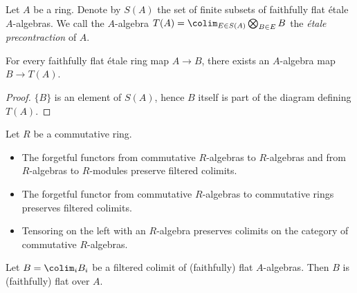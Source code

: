 \begin{definition}
    Let $A$ be a ring. Denote by $S(A)$ the set of finite subsets of faithfully flat étale $A$-algebras.
    We call the $A$-algebra $T(A) = \colim_{E \in S(A)} \bigotimes_{B \in E} B$ the \emph{étale precontraction} of
    $A$.
    \label{def:etale-precontraction}
    \leanok
\end{definition}

\begin{lemma}
    \label{lemma:etale-precontraction-semi-retraction}
    For every faithfully flat étale ring map $A \to B$, there exists an $A$-algebra map $B \to T(A)$.
    \leanok
\end{lemma}

\begin{proof}
    $\{B\}$ is an element of $S(A)$, hence $B$ itself is part of the diagram defining $T(A)$.
    \leanok
\end{proof}

\begin{lemma}
    Let $R$ be a commutative ring.
    \begin{itemize}
        \item The forgetful functors from commutative $R$-algebras to $R$-algebras and
            from $R$-algebras to $R$-modules preserve filtered colimits.
        \item The forgetful functor from commutative $R$-algebras to commutative rings
            preserves filtered colimits.
        \item Tensoring on the left with an $R$-algebra preserves colimits on the
            category of commutative $R$-algebras.
    \end{itemize}
    \label{lemma:commalgcat-colimits}
    \leanok
\end{lemma}

\begin{lemma}
    Let $B = \colim_i B_i$ be a filtered colimit of (faithfully) flat $A$-algebras. Then
    $B$ is (faithfully) flat over $A$.
    \label{lemma:ind-faithfully-flat}
    \leanok
\end{lemma}

